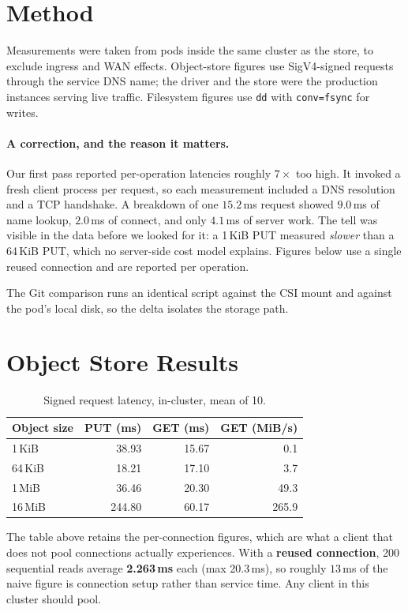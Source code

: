 \documentclass[11pt]{article}
\begin{document}
\section{Method}

Measurements were taken from pods inside the same cluster as the store, to
exclude ingress and WAN effects. Object-store figures use SigV4-signed
requests through the service DNS name; the driver and the store were the
production instances serving live traffic. Filesystem figures use
\texttt{dd} with \texttt{conv=fsync} for writes.

\paragraph{A correction, and the reason it matters.} Our first pass reported
per-operation latencies roughly \(7\times\) too high. It invoked a fresh
client process per request, so each measurement included a DNS resolution and
a TCP handshake. A breakdown of one \(15.2\,\)ms request showed
\(9.0\,\)ms of name lookup, \(2.0\,\)ms of connect, and only
\(4.1\,\)ms of server work. The tell was visible in the data before we
looked for it: a 1\,KiB PUT measured \emph{slower} than a 64\,KiB PUT, which
no server-side cost model explains. Figures below use a single reused
connection and are reported per operation.

The Git comparison runs an identical script against the CSI mount and against
the pod's local disk, so the delta isolates the storage path.

\section{Object Store Results}

\begin{table}[h]
\centering
\begin{tabular}{lrrr}
\toprule
Object size & PUT (ms) & GET (ms) & GET (MiB/s) \\
\midrule
1\,KiB   &  38.93 & 15.67 &   0.1 \\
64\,KiB  &  18.21 & 17.10 &   3.7 \\
1\,MiB   &  36.46 & 20.30 &  49.3 \\
16\,MiB  & 244.80 & 60.17 & 265.9 \\
\bottomrule
\end{tabular}
\caption{Signed request latency, in-cluster, mean of 10.}
\end{table}

The table above retains the per-connection figures, which are what a client
that does not pool connections actually experiences. With a \textbf{reused
connection}, 200 sequential reads average \textbf{2.263\,ms} each
(max 20.3\,ms), so roughly \(13\,\)ms of the naive figure is connection
setup rather than service time. Any client in this cluster should pool.
\end{document}
